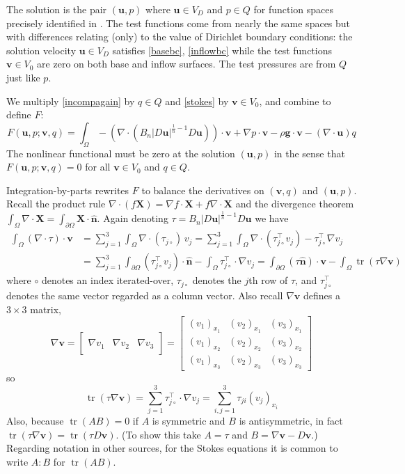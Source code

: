 \documentclass[letterpaper,final,12pt,reqno]{amsart}
\newcommand{\grad}{\nabla}
\newcommand{\trace}{\operatorname{tr}}
\newcommand{\hbn}{\hat{\mathbf{n}}}
\newcommand{\bu}{\mathbf{u}}
\newcommand{\bv}{\mathbf{v}}
\newcommand{\bX}{\mathbf{X}}
\begin{document}
The solution is the pair $(\bu,p)$ where $\bu\in V_D$ and $p \in Q$ for function spaces precisely identified in \cite{JouvetRappaz2011}.  The test functions come from nearly the same spaces but with differences relating (only) to the value of Dirichlet boundary conditions: the solution velocity $\bu\in V_D$ satisfies \eqref{basebc}, \eqref{inflowbc} while the test functions $\bv\in V_0$ are zero on both base and inflow surfaces.  The test pressures are from $Q$ just like $p$.

We multiply \eqref{incompagain} by $q\in Q$ and \eqref{stokes} by $\bv\in V_0$, and combine to define $F$:
\begin{equation}
F(\bu,p;\bv,q) = \int_\Omega - \left(\nabla \cdot \left(B_n |D\bu|^{\frac{1}{n} - 1} D\bu\right)\right)\cdot \bv + \nabla p \cdot \bv - \rho \mathbf{g} \cdot \bv - \left(\nabla \cdot \bu\right) q \label{nonfuncone}
\end{equation}
The nonlinear functional must be zero at the solution $(\bu,p)$ in the sense that $F(\bu,p;\bv,q) = 0$ for all  $\bv\in V_0$ and $q\in Q$.

Integration-by-parts rewrites $F$ to balance the derivatives on $(\bv,q)$ and $(\bu,p)$.  Recall the product rule $\nabla \cdot(f\bX) = \grad f\cdot \bX + f \nabla \cdot \bX$ and the divergence theorem $\int_\Omega \nabla \cdot \bX = \int_{\partial \Omega} \bX \cdot \hbn$.  Again denoting $\tau = B_n |D\bu|^{\frac{1}{n} - 1} D\bu$ we have
\begin{align*}
\int_\Omega \left(\nabla \cdot \tau\right)\cdot \bv &= \sum_{j=1}^3 \int_\Omega \nabla \cdot (\tau_{j\circ})\, v_j = \sum_{j=1}^3 \int_\Omega \nabla \cdot (\tau_{j\circ}^\top v_j) - \tau_{j\circ}^\top \nabla v_j \\
  &= \sum_{j=1}^3 \int_{\partial \Omega} (\tau_{j\circ}^\top v_j) \cdot \hbn - \int_\Omega \tau_{j\circ}^\top \cdot \nabla v_j = \int_{\partial \Omega} (\tau \hbn)\cdot \bv - \int_\Omega \trace(\tau \nabla \bv)
\end{align*}
where $\circ$ denotes an index iterated-over, $\tau_{j\circ}$ denotes the $j$th row of $\tau$, and $\tau_{j\circ}^\top$ denotes the same vector regarded as a column vector.  Also recall $\grad\bv$ defines a $3\times 3$ matrix,
\newcommand{\trefthree}[3]{\left[\begin{array}{c|c|c} & & \\ #1 & #2 & #3 \\ & & \end{array}\right]}
    $$\grad \bv = \trefthree{\grad v_1}{\grad v_2}{\grad v_3} = \begin{bmatrix}
    (v_1)_{x_1} & (v_2)_{x_1} & (v_3)_{x_1} \\
    (v_1)_{x_2} & (v_2)_{x_2} & (v_3)_{x_2} \\
    (v_1)_{x_3} & (v_2)_{x_3} & (v_3)_{x_3}
    \end{bmatrix}$$
so
    $$\trace(\tau \grad \bv) = \sum_{j=1}^3 \tau_{j\circ}^\top \cdot \grad v_j = \sum_{i,j=1}^3 \tau_{ji} (v_j)_{x_i}$$
Also, because $\trace(AB)=0$ if $A$ is symmetric and $B$ is antisymmetric, in fact $\trace(\tau \grad \bv) = \trace(\tau D\bv)$.  (To show this take $A=\tau$ and $B=\grad\bv-D\bv$.)  Regarding notation in other sources, for the Stokes equations it is common to write $A:B$ for $\trace(AB)$.
\end{document}
